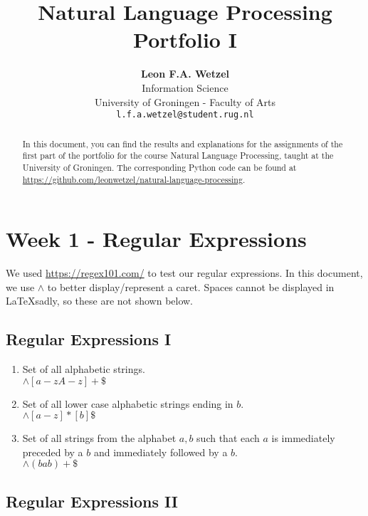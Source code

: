 \documentclass[a4paper, 11pt]{article}
\title{\textbf{Natural Language Processing}\\Portfolio I}
\author{\textbf{Leon F.A. Wetzel}\\ Information Science \\ University of Groningen - Faculty of Arts\\ \texttt{l.f.a.wetzel@student.rug.nl}}
\begin{document}
\maketitle

\begin{abstract}
	
	In this document, you can find the results and explanations for the assignments of the first part of the portfolio for the course Natural Language Processing, taught at the University of Groningen. The corresponding Python code can be found at \url{https://github.com/leonwetzel/natural-language-processing}.

\end{abstract}

\section{Week 1 - Regular Expressions}

We used \url{https://regex101.com/} to test our regular expressions. In this document, we use \texttt{$\wedge$} to better display/represent a caret. Spaces cannot be displayed in \LaTeX  sadly, so these are not shown below.

\subsection{Regular Expressions I}

\begin{enumerate}
	\item Set of all alphabetic strings. \\ $ \wedge [a-zA-z ]+\$ $
	
	\item Set of all lower case alphabetic strings ending in $b$. \\ $\wedge [a-z ]*[b]\$ $
	
	\item Set of all strings from the alphabet ${a,b}$ such that each $a$ is immediately preceded by a $b$ and immediately followed by a $b$. \\$\wedge(bab)+\$ $
\end{enumerate}

\subsection{Regular Expressions II}
\end{document}
